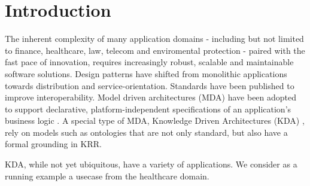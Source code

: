 \documentclass[runningheads]{llncs}
\begin{document}
\vspace{-0.8cm}
\section{Introduction}
The inherent complexity of many application domains \-- including but not limited to finance, healthcare, law, telecom and enviromental protection \-- paired with the fast pace of innovation, requires increasingly robust, scalable and maintainable software solutions. Design patterns have shifted from monolithic applications towards distribution and service-orientation. Standards have been published to improve interoperability. Model driven architectures (MDA) have been adopted to support declarative, platform-independent specifications of an application's business logic \cite{Mellor:2004:MD:983969}. A special type of MDA, Knowledge Driven Architectures (KDA) \cite{Rector:2010}, rely on models such as ontologies that are not only standard, but also have a formal grounding in KRR. 


KDA, while not yet ubiquitous, have a variety of applications. We consider as a running example a usecase from the healthcare domain.
\end{document}
